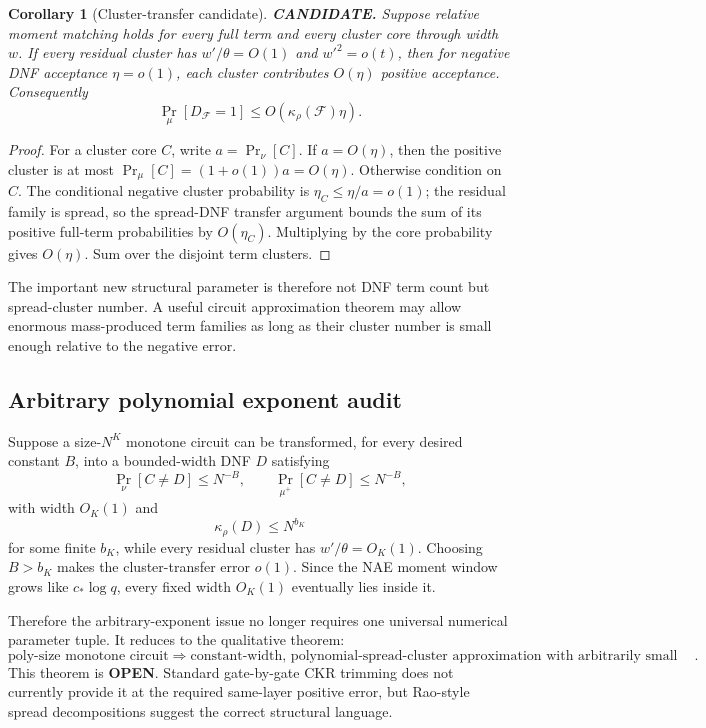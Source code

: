 \documentclass[11pt]{article}
\newtheorem{corollary}[theorem]{Corollary}
\newcommand{\OPEN}{\textbf{OPEN}}
\begin{document}
\begin{corollary}[Cluster-transfer candidate]
\textbf{CANDIDATE.} Suppose relative moment matching holds for every full term and every cluster core through width $w$. If every residual cluster has $w'/\theta=O(1)$ and $w'^2=o(t)$, then for negative DNF acceptance $\eta=o(1)$, each cluster contributes $O(\eta)$ positive acceptance. Consequently
\[\Pr_\mu[D_{\mathcal F}=1]\le O(\kappa_\rho(\mathcal F)\eta).\]
\end{corollary}
\begin{proof}
For a cluster core $C$, write $a=\Pr_\nu[C]$. If $a=O(\eta)$, then the positive cluster is at most $\Pr_\mu[C]=(1+o(1))a=O(\eta)$. Otherwise condition on $C$. The conditional negative cluster probability is $\eta_C\le\eta/a=o(1)$; the residual family is spread, so the spread-DNF transfer argument bounds the sum of its positive full-term probabilities by $O(\eta_C)$. Multiplying by the core probability gives $O(\eta)$. Sum over the disjoint term clusters.
\end{proof}

The important new structural parameter is therefore not DNF term count but spread-cluster number. A useful circuit approximation theorem may allow enormous mass-produced term families as long as their cluster number is small enough relative to the negative error.

\subsection{Arbitrary polynomial exponent audit}
Suppose a size-$N^K$ monotone circuit can be transformed, for every desired constant $B$, into a bounded-width DNF $D$ satisfying
\[\Pr_\nu[C\ne D]\le N^{-B},\qquad \Pr_{\mu^+}[C\ne D]\le N^{-B},\]
with width $O_K(1)$ and
\[\kappa_\rho(D)\le N^{b_K}\]
for some finite $b_K$, while every residual cluster has $w'/\theta=O_K(1)$. Choosing $B>b_K$ makes the cluster-transfer error $o(1)$. Since the NAE moment window grows like $c_*\log q$, every fixed width $O_K(1)$ eventually lies inside it.

Therefore the arbitrary-exponent issue no longer requires one universal numerical parameter tuple. It reduces to the qualitative theorem:
\[\boxed{\text{poly-size monotone circuit}\Longrightarrow\text{constant-width, polynomial-spread-cluster approximation with arbitrarily small polynomial error}.}\]
This theorem is \OPEN. Standard gate-by-gate CKR trimming does not currently provide it at the required same-layer positive error, but Rao-style spread decompositions suggest the correct structural language.
\end{document}
